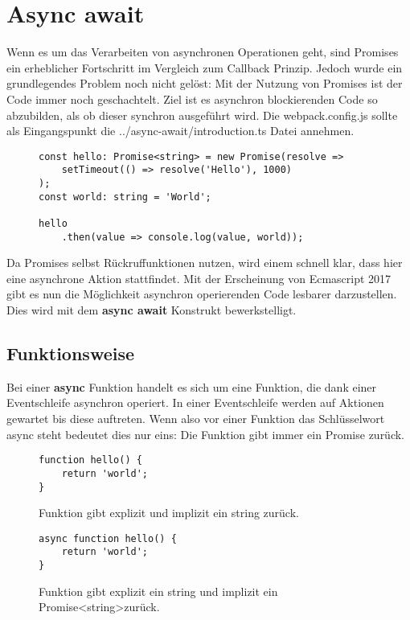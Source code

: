 \section{Async await}
Wenn es um das Verarbeiten von asynchronen Operationen geht, sind Promises ein erheblicher Fortschritt im Vergleich zum Callback Prinzip. Jedoch wurde ein grundlegendes Problem noch nicht gelöst: Mit der Nutzung von Promises ist der Code immer noch geschachtelt. Ziel ist es asynchron blockierenden Code so abzubilden, als ob dieser synchron ausgeführt wird. Die webpack.config.js sollte als Eingangspunkt die ../async-await/introduction.ts Datei annehmen.

\begin{figure}[H]
\begin{lstlisting}[basicstyle=\small]
const hello: Promise<string> = new Promise(resolve =>
    setTimeout(() => resolve('Hello'), 1000)
);
const world: string = 'World';

hello
    .then(value => console.log(value, world));
\end{lstlisting}
\end{figure}

\noindent
Da Promises selbst Rückruffunktionen nutzen, wird einem schnell klar, dass hier eine asynchrone Aktion stattfindet. Mit der Erscheinung von Ecmascript 2017 gibt es nun die Möglichkeit asynchron operierenden Code lesbarer darzustellen. Dies wird mit dem \textbf{async await} Konstrukt bewerkstelligt. 


\subsection{Funktionsweise}

Bei einer \textbf{async} Funktion handelt es sich um eine Funktion, die dank einer Eventschleife asynchron operiert. In einer Eventschleife werden auf Aktionen gewartet bis diese auftreten. Wenn also vor einer Funktion das Schlüsselwort async steht bedeutet dies nur eins: Die Funktion gibt immer ein Promise zurück.

\begin{figure}[H]
\begin{lstlisting}[basicstyle=\small]
function hello() {
    return 'world';
}
\end{lstlisting}
\caption{Funktion gibt explizit und implizit ein string zurück.}
\end{figure}

\begin{figure}[H]
\begin{lstlisting}[basicstyle=\small]
async function hello() {
    return 'world';
}
\end{lstlisting}
\caption{Funktion gibt explizit ein string und implizit ein Promise\textless string\textgreater zurück.}
\end{figure}

